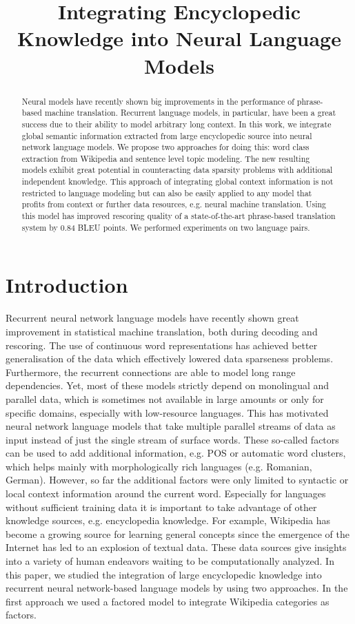 \documentclass[a4paper]{article}
\title{Integrating Encyclopedic Knowledge into Neural Language Models}
\begin{document}
\maketitle
%
\begin{abstract}
Neural models have recently shown big improvements in the performance of phrase-based machine translation. Recurrent language models, in particular, have been a great success due to their ability to model arbitrary long context. In this work, we integrate global semantic information extracted from large encyclopedic source into neural network language models. We propose two approaches for doing this: word class extraction from Wikipedia and sentence level topic modeling. 
The new resulting models exhibit great potential in counteracting data sparsity problems with additional independent knowledge. This approach of integrating global context information is not restricted to language modeling but can also be easily applied to any model that profits from context or further data resources, e.g. neural machine translation. Using this model has improved rescoring quality of a state-of-the-art phrase-based translation system by 0.84 BLEU points. We performed experiments on two language pairs.



\end{abstract}


%
\section{Introduction}
Recurrent neural network language models have recently shown great improvement in statistical machine translation, both during decoding and rescoring. The use of continuous word representations has achieved better generalisation of the data which effectively lowered data sparseness problems. Furthermore, the recurrent connections are able to model long range dependencies. Yet, most of these models strictly depend on monolingual and parallel data, which is sometimes not available in large amounts or only for specific domains, especially with low-resource languages.
This has motivated neural network language models that take multiple parallel streams of data as input instead of just the single stream of surface words. These so-called factors can be used to add additional information, e.g. POS or automatic word clusters, which helps mainly with morphologically rich languages (e.g. Romanian, German). However, so far the additional factors were only limited to syntactic or local context information around the current word. Especially for languages without sufficient training data it is important to take advantage of other knowledge sources, e.g. encyclopedia knowledge. For example, Wikipedia has become a growing source for learning general concepts since the emergence of the Internet has led to an explosion of textual data. These data sources give insights into a variety of human endeavors waiting to be computationally analyzed.
In this paper, we studied the integration of large encyclopedic knowledge into recurrent neural network-based language models by using two approaches. 
In the first approach we used a factored model to integrate Wikipedia categories as factors. 
\end{document}
